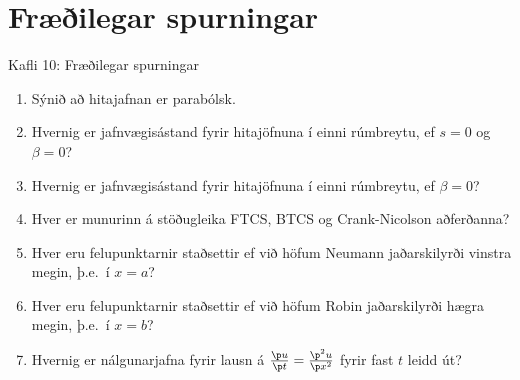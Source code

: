   
\section*{Fræðilegar spurningar}

\begin{frame}{Kafli 10: Fræðilegar spurningar}
\begin{enumerate}
\item Sýnið að hitajafnan er parabólsk.
\item Hvernig er jafnvægisástand fyrir hitajöfnuna í einni rúmbreytu, ef
$s=0$ og $\beta=0$?
\item Hvernig er jafnvægisástand fyrir hitajöfnuna í einni rúmbreytu, ef
$\beta=0$?
\item Hver er munurinn á stöðugleika FTCS, BTCS og Crank-Nicolson aðferðanna?
\item Hver eru felupunktarnir staðsettir ef við höfum Neumann jaðarskilyrði
 vinstra megin, þ.e.~í $x=a$?
\item Hver eru felupunktarnir staðsettir ef við höfum Robin jaðarskilyrði
hægra megin, þ.e.~í $x=b$?
\item Hvernig er  nálgunarjafna fyrir lausn á $\frac{\p u}{\p t}=\frac{\p^2 u}{\p x^2}$
fyrir fast $t$ leidd út? 

  \end{enumerate}
\end{frame}


